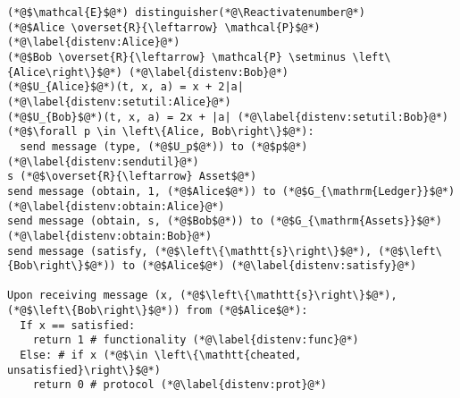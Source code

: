 \Suppressnumber
\begin{lstlisting}[label=distenv, style=numbers]
(*@$\mathcal{E}$@*) distinguisher(*@\Reactivatenumber@*)
(*@$Alice \overset{R}{\leftarrow} \mathcal{P}$@*) (*@\label{distenv:Alice}@*)
(*@$Bob \overset{R}{\leftarrow} \mathcal{P} \setminus \left\{Alice\right\}$@*) (*@\label{distenv:Bob}@*)
(*@$U_{Alice}$@*)(t, x, a) = x + 2|a| (*@\label{distenv:setutil:Alice}@*)
(*@$U_{Bob}$@*)(t, x, a) = 2x + |a| (*@\label{distenv:setutil:Bob}@*)
(*@$\forall p \in \left\{Alice, Bob\right\}$@*):
  send message (type, (*@$U_p$@*)) to (*@$p$@*) (*@\label{distenv:sendutil}@*)
s (*@$\overset{R}{\leftarrow} Asset$@*)
send message (obtain, 1, (*@$Alice$@*)) to (*@$G_{\mathrm{Ledger}}$@*) (*@\label{distenv:obtain:Alice}@*)
send message (obtain, s, (*@$Bob$@*)) to (*@$G_{\mathrm{Assets}}$@*) (*@\label{distenv:obtain:Bob}@*)
send message (satisfy, (*@$\left\{\mathtt{s}\right\}$@*), (*@$\left\{Bob\right\}$@*)) to (*@$Alice$@*) (*@\label{distenv:satisfy}@*)

Upon receiving message (x, (*@$\left\{\mathtt{s}\right\}$@*), (*@$\left\{Bob\right\}$@*)) from (*@$Alice$@*):
  If x == satisfied:
    return 1 # functionality (*@\label{distenv:func}@*)
  Else: # if x (*@$\in \left\{\mathtt{cheated, unsatisfied}\right\}$@*)
    return 0 # protocol (*@\label{distenv:prot}@*)
\end{lstlisting}
